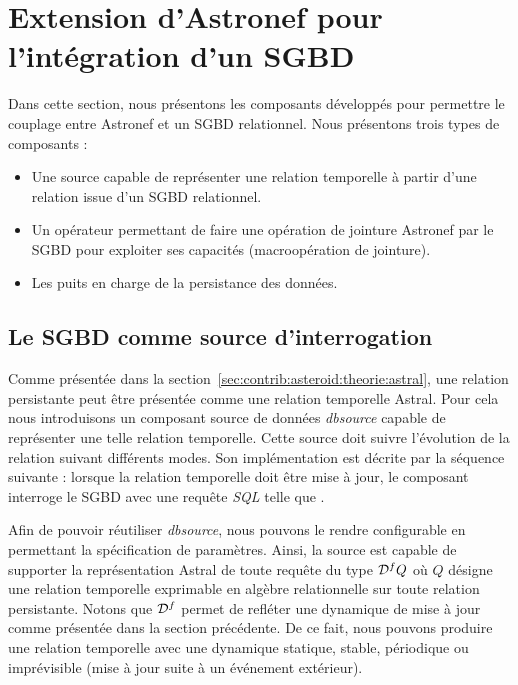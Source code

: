 \section{Extension d'Astronef pour l'intégration d'un SGBD}\label{sec:contrib:asteroid:composants}
Dans cette section, nous présentons les composants développés pour permettre le couplage entre Astronef et un SGBD relationnel. Nous présentons trois types de composants :
\begin{itemize}
	\item Une source capable de représenter une relation temporelle à partir d'une relation issue d'un SGBD relationnel. 
	\item Un opérateur permettant de faire une opération de jointure Astronef par le SGBD pour exploiter ses capacités (macroopération de jointure).
	\item Les puits en charge de la persistance des données.
\end{itemize}

\subsection{Le SGBD comme source d'interrogation}
Comme présentée dans la section~\ref{sec:contrib:asteroid:theorie:astral}, une relation persistante peut être présentée comme une relation temporelle Astral. Pour cela nous introduisons un composant source de données \textit{dbsource} capable de représenter une telle relation temporelle. Cette source doit suivre l'évolution de la relation suivant différents modes. Son implémentation est décrite par la séquence suivante : lorsque la relation temporelle doit être mise à jour, le composant interroge le SGBD avec une requête \textit{SQL} telle que .

Afin de pouvoir réutiliser \textit{dbsource}, nous pouvons le rendre configurable en permettant la spécification de paramètres. Ainsi, la source est capable de supporter la représentation Astral de toute requête du type $\mathcal{D}^f Q$ où $Q$ désigne une relation temporelle exprimable en algèbre relationnelle sur toute relation persistante. Notons que $\mathcal{D}^f$ permet de refléter une dynamique de mise à jour comme présentée dans la section précédente. De ce fait, nous pouvons produire une relation temporelle avec une dynamique statique, stable, périodique ou imprévisible (mise à jour suite à un événement extérieur).

